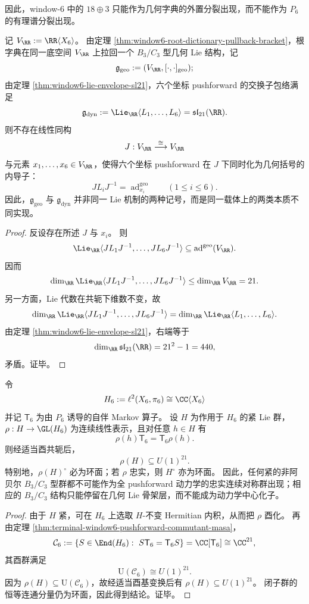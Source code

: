 \noindent
因此，window-\(6\) 中的 \(18\oplus 3\) 只能作为几何字典的外置分裂出现，而不能作为 \(P_6\) 的有理谱分裂出现。

\begin{theorem}\label{thm:conclusion-window6-dual-lie-realizations-incompatible}
记 \(V_{\RR}:=\RR\langle X_6\rangle\)。
由定理 \ref{thm:window6-root-dictionary-pullback-bracket}，根字典在同一底空间 \(V_{\RR}\) 上拉回一个 \(B_3/C_3\) 型几何 Lie 结构，记
\[
\mathfrak g_{\mathrm{geo}}:=(V_{\RR},[\cdot,\cdot]_{\mathrm{geo}});
\]
由定理 \ref{thm:window6-lie-envelope-sl21}，六个坐标 pushforward 的交换子包络满足
\[
\mathfrak g_{\mathrm{dyn}}
:=
\Lie_{\RR}\langle L_1,\dots,L_6\rangle
=
\mathfrak{sl}_{21}(\RR).
\]
则不存在线性同构
\[
J:V_{\RR}\overset{\cong}{\longrightarrow}V_{\RR}
\]
与元素 \(x_1,\dots,x_6\in V_{\RR}\)，使得六个坐标 pushforward 在 \(J\) 下同时化为几何括号的内导子：
\[
J L_i J^{-1}=\operatorname{ad}^{\mathrm{geo}}_{x_i}
\qquad
(1\le i\le 6).
\]
因此，\(\mathfrak g_{\mathrm{geo}}\) 与 \(\mathfrak g_{\mathrm{dyn}}\) 并非同一 Lie 机制的两种记号，而是同一载体上的两类本质不同实现。
\end{theorem}
\begin{proof}
反设存在所述 \(J\) 与 \(x_i\)。
则
\[
\Lie_{\RR}\langle J L_1J^{-1},\dots,J L_6J^{-1}\rangle
\subseteq
\operatorname{ad}^{\mathrm{geo}}(V_{\RR}).
\]
因而
\[
\dim_{\RR}\Lie_{\RR}\langle J L_1J^{-1},\dots,J L_6J^{-1}\rangle
\le
\dim_{\RR}V_{\RR}
=21.
\]
另一方面，Lie 代数在共轭下维数不变，故
\[
\dim_{\RR}\Lie_{\RR}\langle J L_1J^{-1},\dots,J L_6J^{-1}\rangle
=
\dim_{\RR}\Lie_{\RR}\langle L_1,\dots,L_6\rangle.
\]
由定理 \ref{thm:window6-lie-envelope-sl21}，右端等于
\[
\dim_{\RR}\mathfrak{sl}_{21}(\RR)=21^2-1=440,
\]
矛盾。证毕。
\end{proof}

\begin{corollary}[全动力学中心化子的环面化]\label{cor:conclusion-window6-dynamical-centralizer-toralization}
令
\[
H_6:=\ell^2(X_6,\pi_6)\cong \CC\langle X_6\rangle
\]
并记 \(\mathsf T_6\) 为由 \(P_6\) 诱导的自伴 Markov 算子。
设 \(H\) 为作用于 \(H_6\) 的紧 Lie 群，\(\rho:H\to \GL(H_6)\) 为连续线性表示，且对任意 \(h\in H\) 有
\[
\rho(h)\mathsf T_6=\mathsf T_6\rho(h).
\]
则经适当酉共轭后，
\[
\rho(H)\subseteq U(1)^{21}.
\]
特别地，\(\rho(H)^\circ\) 必为环面；若 \(\rho\) 忠实，则 \(H^\circ\) 亦为环面。
因此，任何紧的非阿贝尔 \(B_3/C_3\) 型群都不可能作为全 pushforward 动力学的忠实连续对称群出现；相应的 \(B_3/C_3\) 结构只能停留在几何 Lie 骨架层，而不能成为动力学中心化子。
\end{corollary}
\begin{proof}
由于 \(H\) 紧，可在 \(H_6\) 上选取 \(H\)-不变 Hermitian 内积，从而把 \(\rho\) 酉化。
再由定理 \ref{thm:terminal-window6-pushforward-commutant-masa}，
\[
\mathcal C_6
:=
\{S\in \End(H_6):\ S\mathsf T_6=\mathsf T_6S\}
=
\CC[\mathsf T_6]
\cong
\CC^{21},
\]
其酉群满足
\[
\mathrm U(\mathcal C_6)\cong U(1)^{21}.
\]
因为 \(\rho(H)\subseteq \mathrm U(\mathcal C_6)\)，故经适当酉基变换后有 \(\rho(H)\subseteq U(1)^{21}\)。
闭子群的恒等连通分量仍为环面，因此得到结论。证毕。
\end{proof}

